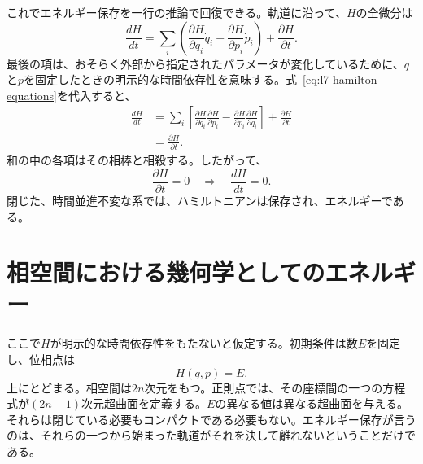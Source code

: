 これでエネルギー保存を一行の推論で回復できる。軌道に沿って、\(H\)の全微分は
\begin{equation}
  \frac{dH}{dt}
  =
  \sum_i\left(
    \frac{\partial H}{\partial q_i}\dot q_i
    +\frac{\partial H}{\partial p_i}\dot p_i
  \right)
  +\frac{\partial H}{\partial t}.
  \label{eq:l7-total-h-derivative}
\end{equation}
最後の項は、おそらく外部から指定されたパラメータが変化しているために、\(q\)と\(p\)を固定したときの明示的な時間依存性を意味する。式~\eqref{eq:l7-hamilton-equations}を代入すると、
\begin{align}
  \frac{dH}{dt}
  &=
  \sum_i\left[
    \frac{\partial H}{\partial q_i}
    \frac{\partial H}{\partial p_i}
    -\frac{\partial H}{\partial p_i}
    \frac{\partial H}{\partial q_i}
  \right]
  +\frac{\partial H}{\partial t}\\
  &=\frac{\partial H}{\partial t}.
  \label{eq:l7-h-energy-rate}
\end{align}
和の中の各項はその相棒と相殺する。したがって、
\begin{equation}
  \frac{\partial H}{\partial t}=0
  \quad\Longrightarrow\quad
  \frac{dH}{dt}=0.
  \label{eq:l7-energy-conservation}
\end{equation}
閉じた、時間並進不変な系では、ハミルトニアンは保存され、エネルギーである。

\begin{classroomqa}
\end{classroomqa}

\section{相空間における幾何学としてのエネルギー}

ここで\(H\)が明示的な時間依存性をもたないと仮定する。初期条件は数\(E\)を固定し、位相点は
\begin{equation}
  H(q,p)=E.
  \label{eq:l7-energy-surface}
\end{equation}
上にとどまる。相空間は\(2n\)次元をもつ。正則点では、その座標間の一つの方程式が\((2n-1)\)次元超曲面を定義する。\(E\)の異なる値は異なる超曲面を与える。それらは閉じている必要もコンパクトである必要もない。エネルギー保存が言うのは、それらの一つから始まった軌道がそれを決して離れないということだけである。

